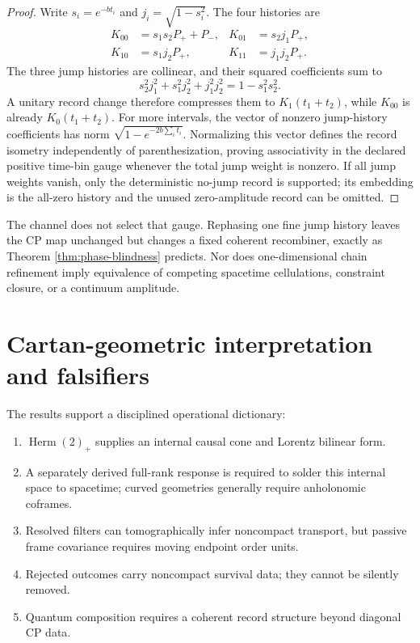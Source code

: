 \documentclass[11pt]{article}
\theoremstyle{remark}
\newcommand{\Herm}{\operatorname{Herm}}
\begin{document}
\begin{proof}
Write $s_i=e^{-bt_i}$ and $j_i=\sqrt{1-s_i^2}$.  The four histories are
\begin{align}
 K_{00}&=s_1s_2P_++P_-,&K_{01}&=s_2j_1P_+,\nonumber\\
 K_{10}&=s_1j_2P_+,&K_{11}&=j_1j_2P_+.
 \label{eq:fine-histories}
\end{align}
The three jump histories are collinear, and their squared coefficients sum to
\begin{equation}
 s_2^2j_1^2+s_1^2j_2^2+j_1^2j_2^2=1-s_1^2s_2^2.
 \label{eq:jump-norm}
\end{equation}
A unitary record change therefore compresses them to $K_1(t_1+t_2)$, while $K_{00}$ is
already $K_0(t_1+t_2)$.  For more intervals, the vector of nonzero jump-history
coefficients has norm $\sqrt{1-e^{-2b\sum_it_i}}$.  Normalizing this vector defines the
record isometry independently of parenthesization, proving associativity in the declared
positive time-bin gauge whenever the total jump weight is nonzero.
If all jump weights vanish, only the deterministic no-jump record is supported; its
embedding is the all-zero history and the unused zero-amplitude record can be omitted.
\end{proof}

The channel does not select that gauge.  Rephasing one fine jump history leaves the CP map
unchanged but changes a fixed coherent recombiner, exactly as Theorem
\ref{thm:phase-blindness} predicts.  Nor does one-dimensional chain refinement imply
equivalence of competing spacetime cellulations, constraint closure, or a continuum
amplitude.



\section{Cartan-geometric interpretation and falsifiers}

The results support a disciplined operational dictionary:
\begin{enumerate}
\item $\Herm(2)_+$ supplies an internal causal cone and Lorentz bilinear form.
\item A separately derived full-rank response is required to solder this
internal space to spacetime; curved geometries generally require anholonomic coframes.
\item Resolved filters can tomographically infer noncompact transport, but passive frame
covariance requires moving endpoint order units.
\item Rejected outcomes carry noncompact survival data; they cannot be silently removed.
\item Quantum composition requires a coherent record structure beyond diagonal CP data.
\end{enumerate}
\end{document}
